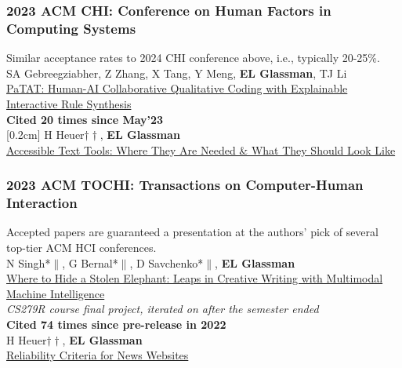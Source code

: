 \documentclass[10pt, a4paper]{article}
\newcommand{\years}[1]{\marginnote{\normalsize #1}}
\begin{document}
\subsubsection*{2023 ACM \textbf{CHI}: Conference on Human Factors in Computing Systems}
Similar acceptance rates to 2024 CHI conference above, i.e., typically 20-25\%.\\[0.2cm]
\years{\textbf{C30}}SA Gebreegziabher, Z Zhang, X Tang, Y Meng, \textbf{EL Glassman}, TJ Li\\ \href{http://glassmanlab.seas.harvard.edu/papers/patat_CHI23.pdf}{PaTAT: Human-AI Collaborative Qualitative Coding with Explainable Interactive Rule Synthesis}\\
\textbf{Cited 20 times since May'23}\\
[0.2cm]
\years{\textbf{C29} LBW}H Heuer$\dagger\dagger$, \textbf{EL Glassman}\\
\href{https://glassmanlab.seas.harvard.edu/papers/heuer_CHI23LBW_accessibleTextTools.pdf}{Accessible Text Tools: Where They Are Needed \& What They Should Look Like}\\

\subsubsection*{2023 ACM \textbf{TOCHI}: Transactions on Computer-Human Interaction}
Accepted papers are guaranteed a presentation at the authors' pick of several top-tier ACM HCI conferences.\\

\years{\textbf{J4}}N Singh*$\|$, G Bernal*$\|$, D Savchenko*$\|$, \textbf{EL Glassman}\\
\href{http://glassmanlab.seas.harvard.edu/papers/elephant_tochi2022.pdf}{Where to Hide a Stolen Elephant: Leaps in Creative Writing with Multimodal Machine Intelligence}\\
\textit{CS279R course final project, iterated on after the semester ended}\\
\textbf{Cited 74 times since pre-release in 2022}\\[0.2cm]
\years{\textbf{J3}}H Heuer$\dagger\dagger$, \textbf{EL Glassman}\\
\href{http://glassmanlab.seas.harvard.edu/papers/reliability_criteria.pdf}{Reliability Criteria for News Websites}
\end{document}
